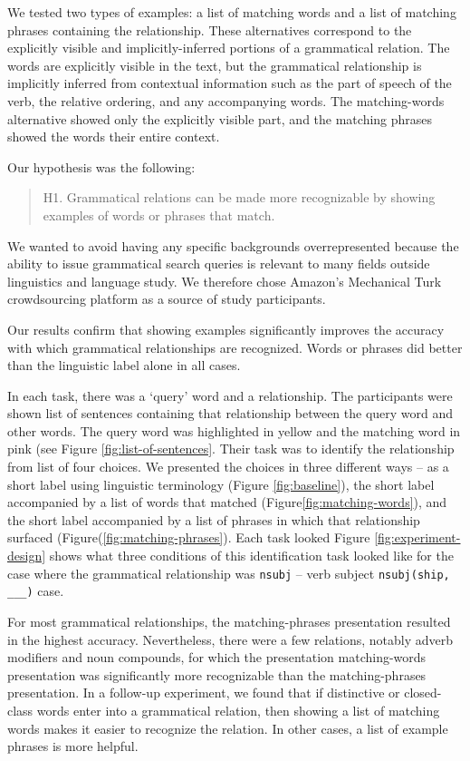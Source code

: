 \documentclass{sigchi}
\newcommand{\code}[1] {\texttt{#1}}
\begin{document}
We tested two types of examples: a list of matching words and a list of matching phrases containing the relationship. These alternatives correspond to the explicitly visible and implicitly-inferred portions of a grammatical relation. The words are explicitly visible in the text, but the grammatical relationship is implicitly inferred from contextual information such as the part of speech of the verb, the relative ordering, and any accompanying words. The matching-words alternative showed only the explicitly visible part, and the matching phrases showed the words their entire context.

Our hypothesis was the following:
\begin{quote}
	H1. Grammatical relations can be made more recognizable by showing examples of words or phrases that match.
\end{quote}

We wanted to avoid having any specific backgrounds overrepresented because  the ability to issue grammatical search queries is relevant to many fields outside linguistics and language study. We therefore chose Amazon's Mechanical Turk crowdsourcing platform as a source of study participants. 

Our results confirm that showing examples significantly improves the accuracy with which grammatical relationships are recognized. Words or phrases did better than the linguistic label alone in all cases. 

In each task, there was a `query' word and a relationship. The participants were shown list of sentences containing that relationship between the query word and other words. The query word was highlighted in yellow and the matching word in pink (see Figure \ref{fig:list-of-sentences}. Their task was to identify the relationship from list of four choices. We presented the choices in three different ways -- as a short label using linguistic terminology (Figure \ref{fig:baseline}), the short label accompanied by a list of words that matched (Figure\ref{fig:matching-words}), and the short label accompanied by a list of phrases in which that relationship surfaced (Figure(\ref{fig:matching-phrases}).  Each task looked Figure \ref{fig:experiment-design} shows what three conditions of this identification task looked like for the case where the grammatical relationship was \code{nsubj} -- verb subject \code{nsubj(ship, \_\_\_)} case.





For most  grammatical relationships, the matching-phrases presentation resulted in the highest accuracy. Nevertheless, there were a few relations, notably  adverb modifiers and noun compounds,  for which the presentation matching-words presentation was significantly more recognizable than the matching-phrases presentation. In a follow-up experiment, we found that  if distinctive or closed-class words enter into a grammatical relation, then showing a list of matching words makes it easier to recognize the relation. In other cases, a list of example phrases is more helpful.
\end{document}
